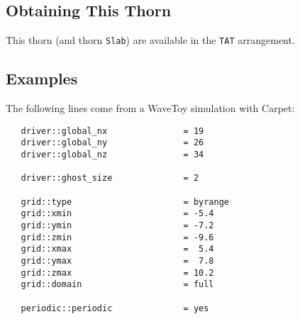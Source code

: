 \subsection{Obtaining This Thorn}

   This thorn (and thorn \texttt{Slab}) are available in the
   \texttt{TAT} arrangement.

\subsection{Examples}

   The following lines come from a WaveToy simulation with Carpet:
\begin{verbatim}
   driver::global_nx               = 19
   driver::global_ny               = 26
   driver::global_nz               = 34

   driver::ghost_size              = 2

   grid::type                      = byrange
   grid::xmin                      = -5.4
   grid::ymin                      = -7.2
   grid::zmin                      = -9.6
   grid::xmax                      =  5.4
   grid::ymax                      =  7.8
   grid::zmax                      = 10.2
   grid::domain                    = full

   periodic::periodic              = yes
\end{verbatim}



